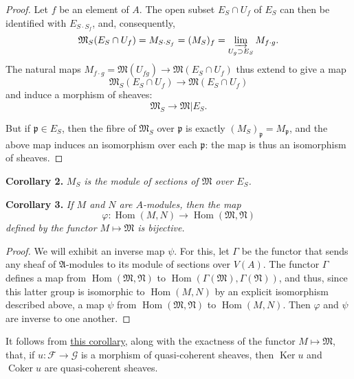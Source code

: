 \documentclass{article}
\newenvironment{itenv}[1]
  {\phantomsection\par\medskip\noindent\textbf{#1.}\itshape}
  {\medskip}
\newcommand{\scr}[1]{{\mathscr{#1}}}
\DeclareMathOperator{\Hom}{Hom}
\DeclareMathOperator{\Ker}{Ker}
\DeclareMathOperator{\Coker}{Coker}
\newcommand{\oldpage}[1]{\marginpar{\footnotesize$\Big\vert$ \textit{p.~#1}}}
\begin{document}
\begin{proof}
  Let $f$ be an element of $A$.
  The open subset $E_S\cap U_f$ of $E_S$ can then be identified with $E_{S\cdot S_f}$, and, consequently,
  \[
    \mathfrak{M}_S(E_S\cap U_f)
    = M_{S\cdot S_f}
    = (M_S)_f
    = \varinjlim_{U_g\supset E_S}M_{f\cdot g}.
  \]
  The natural maps $M_{f\cdot g}=\mathfrak{M}(U_{fg})\to\mathfrak{M}(E_S\cap U_f)$ thus extend to give a map
  \[
    \mathfrak{M}_S(E_S\cap U_f) \to \mathfrak{M}(E_S\cap U_f)
  \]
  and induce a morphism of sheaves:
  \[
    \mathfrak{M}_S \to \mathfrak{M}|E_S.
  \]

  But if $\mathfrak{p}\in E_S$, then the fibre of $\mathfrak{M}_S$ over $\mathfrak{p}$ is exactly $(M_S)_\mathfrak{p}=M_\mathfrak{p}$, and the above map induces an isomorphism over each $\mathfrak{p}$:
  the map is thus an isomorphism of sheaves.
\end{proof}

\oldpage{1-07}
\begin{itenv}{Corollary 2}
\label{corollary2}
  $M_S$ is the module of sections of $\mathfrak{M}$ over $E_S$.
\end{itenv}

\begin{itenv}{Corollary 3}
\label{corollary3}
  If $M$ and $N$ are $A$-modules, then the map \[\varphi\colon\Hom(M,N)\to\Hom(\mathfrak{M},\mathfrak{N})\] defined by the functor $M\mapsto\mathfrak{M}$ is bijective.
\end{itenv}

\begin{proof}
  We will exhibit an inverse map $\psi$.
  For this, let $\Gamma$ be the functor that sends any sheaf of $\mathfrak{A}$-modules to its module of sections over $V(A)$.
  The functor $\Gamma$ defines a map from $\Hom(\mathfrak{M},\mathfrak{N})$ to $\Hom(\Gamma(\mathfrak{M}),\Gamma(\mathfrak{N}))$, and thus, since this latter group is isomorphic to $\Hom(M,N)$ by an explicit isomorphism described above, a map $\psi$ from $\Hom(\mathfrak{M},\mathfrak{N})$ to $\Hom(M,N)$.
  Then $\varphi$ and $\psi$ are inverse to one another.
\end{proof}

It follows from \hyperref[corollary3]{this corollary}, along with the exactness of the functor $M\mapsto\mathfrak{M}$, that, if $u\colon\scr{F}\to\scr{G}$ is a morphism of quasi-coherent sheaves, then $\Ker u$ and $\Coker u$ are quasi-coherent sheaves.
\end{document}
